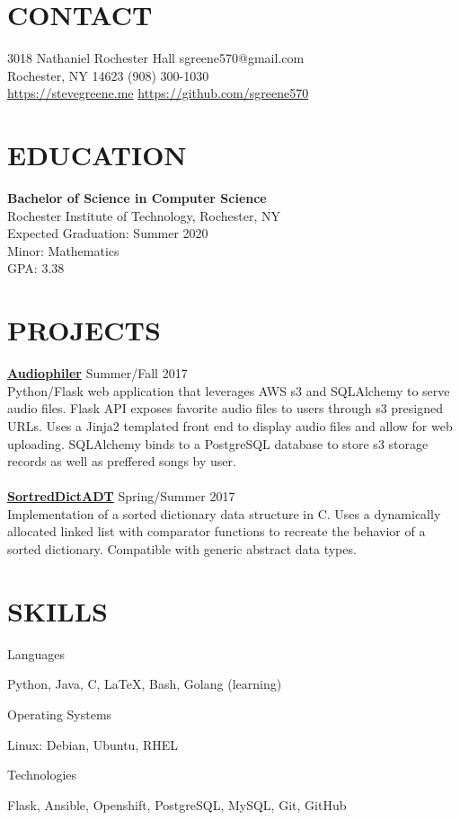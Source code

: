 \documentclass[line, margin, 11pt]{res}
\begin{document}

\begin{resume}

\section {CONTACT}
3018 Nathaniel Rochester Hall \hfill sgreene570@gmail.com \\
Rochester, NY 14623 \hfill (908) 300-1030 \\
\url{https://stevegreene.me} \hfill \url{https://github.com/sgreene570}

\section{EDUCATION}
{\bf Bachelor of Science in Computer Science} \\
Rochester Institute of Technology, Rochester, NY \\
Expected Graduation: Summer 2020 \\
Minor: Mathematics \\
GPA: 3.38

\section{PROJECTS}
{\bf \href{https://github.com/sgreene570/audiophiler}{Audiophiler}} \hfill Summer/Fall 2017 \\
Python/Flask web application that leverages AWS s3 and SQLAlchemy to serve audio
files.  Flask API exposes favorite audio files to users through s3 presigned URLs.
Uses a Jinja2 templated front end to display audio files and allow for web uploading.  SQLAlchemy binds
to a PostgreSQL database to store s3 storage records as well as preffered songs by user.
\\
\\
{\bf \href{https://github.com/sgreene570/SortedDictADT}{SortredDictADT}} \hfill Spring/Summer 2017 \\
Implementation of a sorted dictionary data structure in C.  Uses a dynamically allocated linked list with comparator functions
to recreate the behavior of a sorted dictionary.  Compatible with generic abstract data types.

\section{SKILLS}
\begin{compactdesc}
    \item[Languages] \begin{inparaenum} {Python, Java, C, \LaTeX, Bash, Golang (learning)} \end{inparaenum}
    \item[Operating Systems] \begin{inparaenum} {Linux: Debian, Ubuntu, RHEL} \end{inparaenum}
    \item[Technologies] \begin{inparaenum} {Flask, Ansible, Openshift, PostgreSQL, MySQL, Git, GitHub} \end{inparaenum}
\end{compactdesc}


\end{resume}
\end{document}
